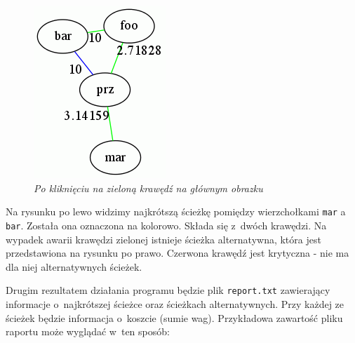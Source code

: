 \documentclass[a4paper, 12pt]{article}
\begin{document}
\begin{figure}[ht]
\hspace{0.5cm}
\begin{minipage}[b]{0.45\linewidth}
\centering
\includegraphics[width=\textwidth]{picture2.png}
\caption{\em Po kliknięciu na zieloną krawędź na głównym obrazku}
\label{fig:picture2}
\end{minipage}
\end{figure}

Na rysunku po lewo widzimy najkrótszą ścieżkę pomiędzy wierzchołkami \texttt{mar} a \texttt{bar}. Została ona oznaczona na kolorowo. Składa się z~dwóch krawędzi. Na wypadek awarii krawędzi zielonej istnieje ścieżka alternatywna, która jest przedstawiona na rysunku po prawo. Czerwona krawędź jest krytyczna - nie ma dla niej alternatywnych ścieżek.

Drugim rezultatem działania programu będzie plik \texttt{report.txt} zawierający informacje o~najkrótszej ścieżce oraz ścieżkach alternatywnych. Przy każdej ze ścieżek będzie informacja o~koszcie (sumie wag). Przykładowa zawartość pliku raportu może wyglądać w~ten sposób:
\end{document}
